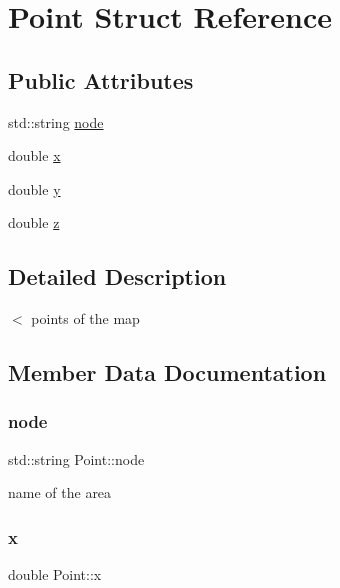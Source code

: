 \hypertarget{structPoint}{}\section{Point Struct Reference}
\label{structPoint}
\subsection*{Public Attributes}
\begin{DoxyCompactItemize}
\item 
std\+::string \hyperlink{structPoint_a0f88d21a7c21079e24a66fa177b62d58}{node}
\item 
double \hyperlink{structPoint_ab99c56589bc8ad5fa5071387110a5bc7}{x}
\item 
double \hyperlink{structPoint_afa38be143ae800e6ad69ce8ed4df62d8}{y}
\item 
double \hyperlink{structPoint_a05ba3b1dfcb19430582ae953cbbfbded}{z}
\end{DoxyCompactItemize}


\subsection{Detailed Description}
$<$ points of the map 

\subsection{Member Data Documentation}
\mbox{\label{structPoint_a0f88d21a7c21079e24a66fa177b62d58}} 
\subsubsection{\texorpdfstring{node}{node}}
{\footnotesize\ttfamily std\+::string Point\+::node}

name of the area \mbox{\label{structPoint_ab99c56589bc8ad5fa5071387110a5bc7}} 
\subsubsection{\texorpdfstring{x}{x}}
{\footnotesize\ttfamily double Point\+::x}

\mbox{\label{structPoint_afa38be143ae800e6ad69ce8ed4df62d8}} 
